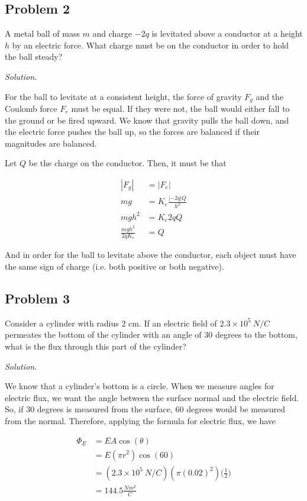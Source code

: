 \documentclass{article}
\begin{document}
	\subsection{Problem 2}
	
	A metal ball of mass $m$ and charge $-2q$ is levitated above a conductor at a height $h$ by an electric force. What charge must be on the conductor in order to hold the ball steady?
	
	\textit{Solution.}
	
	For the ball to levitate at a consistent height, the force of gravity $F_g$ and the Coulomb force $F_e$ must be equal. If they were not, the ball would either fall to the ground or be fired upward. We know that gravity pulls the ball down, and the electric force pushes the ball up, so the forces are balanced if their magnitudes are balanced.
	
	Let $Q$ be the charge on the conductor. Then, it must be that
	
	\begin{equation*}
	\begin{split}
	|F_g| & = |F_e| \\
	mg  & = K_e \frac{|-2q| Q}{h^2} \\
	mgh^2 & = K_e 2q Q \\
	\frac{mgh^2}{2q K_e} & = Q
	\end{split}
	\end{equation*}
	
	And in order for the ball to levitate above the conductor, each object must have the same sign of charge (i.e. both positive or both negative).
	
	\subsection{Problem 3}
	
	Consider a cylinder with radius 2 cm. If an electric field of $2.3 \times 10^5 \ N/C$ permeates the bottom of the cylinder with an angle of 30 degrees to the bottom, what is the flux through this part of the cylinder?
	
	\textit{Solution.}
	
	We know that a cylinder's bottom is a circle. When we measure angles for electric flux, we want the angle between the surface normal and the electric field. So, if 30 degrees is measured from the surface, 60 degrees would be measured from the normal. Therefore, applying the formula for electric flux, we have
	
	\begin{equation*}
	\begin{split}
	\Phi_E & = EA\cos(\theta) \\
	       & = E (\pi r^2) \cos(60) \\
	       & = (2.3 \times 10^5 \ N/C) (\pi (0.02)^2) \Big(\frac{1}{2} \Big) \\
	       & = 144.5 \frac{Nm^2}{C}
	\end{split}
	\end{equation*} 
	
	
	
	
	
	
	
	
	
\end{document}
